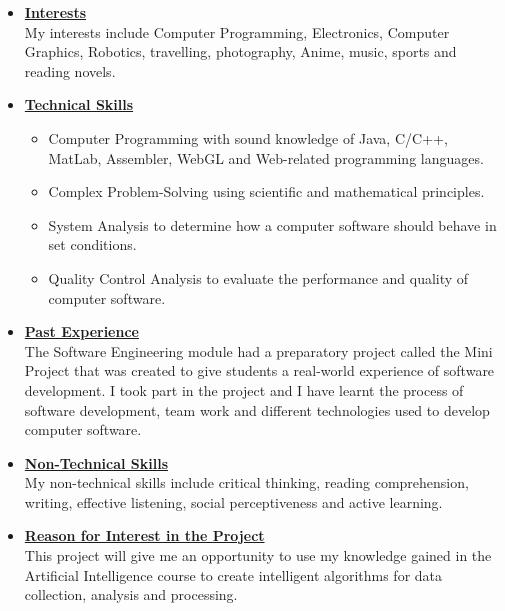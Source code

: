 \documentclass[a4paper,12pt]{article}
\begin{document}
\begin{itemize}
\item {\large \underline{\textbf{Interests}}}\\[0.2cm]
My interests include Computer Programming, Electronics, Computer Graphics, Robotics, travelling, photography, Anime, music, sports and reading novels.
\\
\item {\large \underline{\textbf{Technical Skills}}}

	\begin{itemize}
		\item Computer Programming with sound knowledge of Java, C/C++, MatLab, Assembler, WebGL and Web-related 			programming languages.
		\item Complex Problem-Solving using scientific and mathematical principles.
		\item System Analysis to determine how a computer software should behave in set conditions.
		\item Quality Control Analysis to evaluate the performance and quality of computer software.
	\end{itemize}
\bigskip
\item {\large \underline{\textbf{Past Experience}}}\\[0.2cm]
The Software Engineering module had a preparatory project called the Mini Project that was created to give students a real-world experience of software development. I took part in the project and I have learnt the process of software development, team work and different technologies used to develop computer software. 
\\
\item {\large \underline{\textbf{Non-Technical Skills}}}\\[0.2cm]
My non-technical skills include critical thinking, reading comprehension, writing, effective listening, social perceptiveness and active learning. 
\newpage
\item {\large \underline{\textbf{Reason for Interest in the Project}}}\\[0.2cm]
This project will give me an opportunity to use my knowledge gained in the Artificial Intelligence course to create intelligent algorithms for data collection, analysis and processing.

\end{itemize}

\newpage
\end{document}
